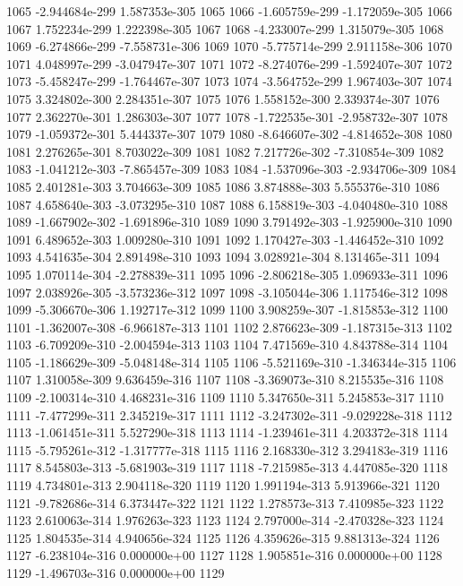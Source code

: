 \documentclass{article}
\begin{document}
\begin{Schunk}
\begin{Soutput}
1065 -2.944684e-299  1.587353e-305 1065
1066 -1.605759e-299 -1.172059e-305 1066
1067  1.752234e-299  1.222398e-305 1067
1068 -4.233007e-299  1.315079e-305 1068
1069 -6.274866e-299 -7.558731e-306 1069
1070 -5.775714e-299  2.911158e-306 1070
1071  4.048997e-299 -3.047947e-307 1071
1072 -8.274076e-299 -1.592407e-307 1072
1073 -5.458247e-299 -1.764467e-307 1073
1074 -3.564752e-299  1.967403e-307 1074
1075  3.324802e-300  2.284351e-307 1075
1076  1.558152e-300  2.339374e-307 1076
1077  2.362270e-301  1.286303e-307 1077
1078 -1.722535e-301 -2.958732e-307 1078
1079 -1.059372e-301  5.444337e-307 1079
1080 -8.646607e-302 -4.814652e-308 1080
1081  2.276265e-301  8.703022e-309 1081
1082  7.217726e-302 -7.310854e-309 1082
1083 -1.041212e-303 -7.865457e-309 1083
1084 -1.537096e-303 -2.934706e-309 1084
1085  2.401281e-303  3.704663e-309 1085
1086  3.874888e-303  5.555376e-310 1086
1087  4.658640e-303 -3.073295e-310 1087
1088  6.158819e-303 -4.040480e-310 1088
1089 -1.667902e-302 -1.691896e-310 1089
1090  3.791492e-303 -1.925900e-310 1090
1091  6.489652e-303  1.009280e-310 1091
1092  1.170427e-303 -1.446452e-310 1092
1093  4.541635e-304  2.891498e-310 1093
1094  3.028921e-304  8.131465e-311 1094
1095  1.070114e-304 -2.278839e-311 1095
1096 -2.806218e-305  1.096933e-311 1096
1097  2.038926e-305 -3.573236e-312 1097
1098 -3.105044e-306  1.117546e-312 1098
1099 -5.306670e-306  1.192717e-312 1099
1100  3.908259e-307 -1.815853e-312 1100
1101 -1.362007e-308 -6.966187e-313 1101
1102  2.876623e-309 -1.187315e-313 1102
1103 -6.709209e-310 -2.004594e-313 1103
1104  7.471569e-310  4.843788e-314 1104
1105 -1.186629e-309 -5.048148e-314 1105
1106 -5.521169e-310 -1.346344e-315 1106
1107  1.310058e-309  9.636459e-316 1107
1108 -3.369073e-310  8.215535e-316 1108
1109 -2.100314e-310  4.468231e-316 1109
1110  5.347650e-311  5.245853e-317 1110
1111 -7.477299e-311  2.345219e-317 1111
1112 -3.247302e-311 -9.029228e-318 1112
1113 -1.061451e-311  5.527290e-318 1113
1114 -1.239461e-311  4.203372e-318 1114
1115 -5.795261e-312 -1.317777e-318 1115
1116  2.168330e-312  3.294183e-319 1116
1117  8.545803e-313 -5.681903e-319 1117
1118 -7.215985e-313  4.447085e-320 1118
1119  4.734801e-313  2.904118e-320 1119
1120  1.991194e-313  5.913966e-321 1120
1121 -9.782686e-314  6.373447e-322 1121
1122  1.278573e-313  7.410985e-323 1122
1123  2.610063e-314  1.976263e-323 1123
1124  2.797000e-314 -2.470328e-323 1124
1125  1.804535e-314  4.940656e-324 1125
1126  4.359626e-315  9.881313e-324 1126
1127 -6.238104e-316   0.000000e+00 1127
1128  1.905851e-316   0.000000e+00 1128
1129 -1.496703e-316   0.000000e+00 1129

\end{Soutput}
\end{Schunk}
\end{document}
